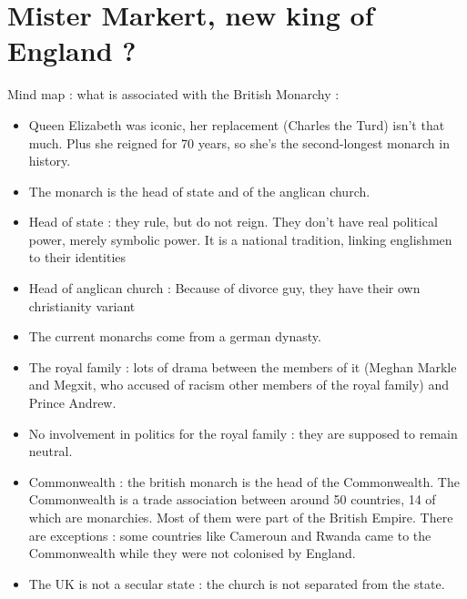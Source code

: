 \documentclass[a4paper,12pt]{book}
\begin{document}
\chapter{Mister Markert, new king of England ?}
Mind map : what is associated with the British Monarchy :\begin{itemize}
\item Queen Elizabeth was iconic, her replacement (Charles the Turd) isn't that much. Plus she reigned for 70 years, so she's the second-longest monarch in history.
\item The monarch is the head of state and of the anglican church.
\item Head of state : they rule, but do not reign. They don't have real political power, merely symbolic power. It is a national tradition, linking englishmen to their identities
\item Head of anglican church : Because of divorce guy, they have their own christianity variant
\item The current monarchs come from a german dynasty.
\item The royal family : lots of drama between the members of it (Meghan Markle and Megxit, who accused of racism other members of the royal family) and Prince Andrew.
\item No involvement in politics for the royal family : they are supposed to remain neutral.
\item Commonwealth : the british monarch is the head of the Commonwealth. The Commonwealth is a trade association between around 50 countries, 14 of which are monarchies. Most of them were part of the British Empire. There are exceptions : some countries like Cameroun and Rwanda came to the Commonwealth while they were not colonised by England.
\item The UK is not a secular state : the church is not separated from the state.
\end{itemize}
\end{document}
